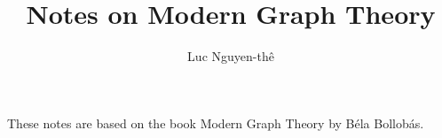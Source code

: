 \documentclass[a4paper,11pt]{article}
\title{Notes on Modern Graph Theory}
\author{Luc Nguyen-th\^e}
\begin{document}
\maketitle

These notes are based on the book Modern Graph Theory by B\'ela Bollob\'as.

\tableofcontents


\end{document}
